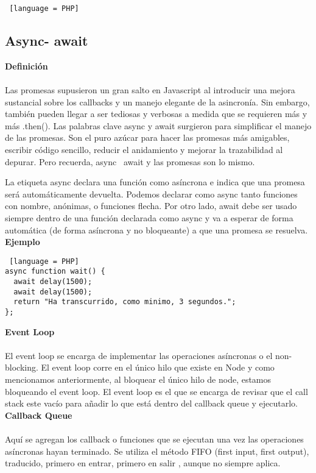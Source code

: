 \documentclass[a4paper, 12pt]{article}
\begin{document}
{\begin{lstlisting} [language = PHP]
\end{lstlisting} 

\subsection*{Async- await}
{\bf Definici\'on}\\ \\
Las promesas supusieron un gran salto en Javascript al introducir una mejora sustancial sobre los callbacks y un manejo elegante de la asincron\'ia. Sin embargo, tambi\'en pueden llegar a ser tediosas y verbosas a medida que se requieren m\'as y m\'as .then(). Las palabras clave async y await surgieron para simplificar el manejo de las promesas. Son el puro az\'ucar para hacer las promesas m\'as amigables, escribir c\'odigo  sencillo, reducir el anidamiento y mejorar la trazabilidad al depurar. Pero recuerda, async \ await y las promesas son lo mismo.

La etiqueta async declara una funci\'on como as\'incrona e indica que una promesa ser\'a autom\'aticamente devuelta. Podemos declarar como async tanto funciones con nombre, an\'onimas, o funciones flecha. Por otro lado, await debe ser usado siempre dentro de una funci\'on declarada como async y va a esperar de forma autom\'atica (de forma as\'incrona y no bloqueante) a que una promesa se resuelva.\\


{\bf Ejemplo}

\begin{lstlisting} [language = PHP]
async function wait() {
  await delay(1500);
  await delay(1500);
  return "Ha transcurrido, como minimo, 3 segundos.";
};
\end{lstlisting}

{\bf Event Loop }\\ \\
El event loop se encarga de implementar las operaciones as\'incronas o el non-blocking. El event loop corre en el \'unico hilo que existe en Node y como mencionamos anteriormente, al bloquear el \'unico hilo de node, estamos bloqueando el event loop.
El event loop es el que se encarga de revisar que el call stack este vac\'io para a\~nadir lo que est\'a dentro del callback queue y ejecutarlo.  \\

{\bf Callback Queue}\\ \\
Aqu\'i se agregan los callback o funciones que se ejecutan una vez las operaciones as\'incronas hayan terminado. Se utiliza el m\'etodo FIFO (first input, first output), traducido, primero en entrar, primero en salir , aunque no siempre aplica.

}
\end{document}
